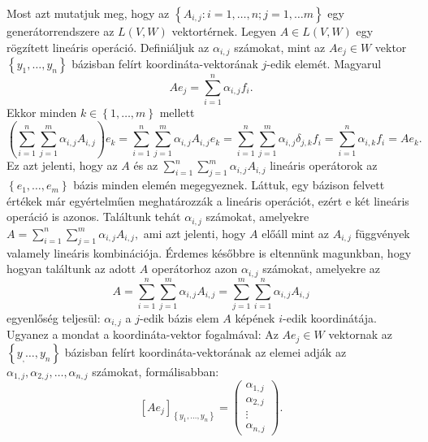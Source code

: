 \documentclass[9pt, showtrims]{memoir}
\makeatletter
\renewenvironment{proof}[1][\proofname]
    {\par\pushQED{\qed}%
    \normalfont \topsep6\p@\@plus6\p@\relax
    \trivlist
    \item[\hskip\labelsep
        \itshape
    #1\@addpunct{:}]\ignorespaces}
    {\popQED\endtrivlist\@endpefalse}
\theoremstyle{plain}
\theoremstyle{remark}
\theoremstyle{definition}
\makeatother
\begin{document}
\begin{proof}
    Most azt mutatjuk meg, hogy az $\left\{ A_{i,j}:i=1,\dots,n;j=1,\dots m \right\}$ egy
    generátorrendszere az $L\left( V,W \right)$ vektortérnek.
    Legyen $A\in L\left( V,W \right)$ egy rögzített lineáris operáció.
    Definiáljuk az $\alpha_{i,j}$ számokat, 
    mint az $Ae_{j}\in W$ vektor $\left\{ y_1,\dots,y_n \right\}$ bázisban felírt koordináta-vektorának 
    $j$-edik elemét. 
    Magyarul
    \[
        Ae_j=
        \sum_{i=1}^n\alpha_{i,j}f_i.
    \]
    Ekkor minden $k\in\left\{ 1,\dots,m \right\}$ mellett
    \[
        \left( \sum_{i=1}^n\sum_{j=1}^m\alpha_{i,j}A_{i,j} \right)e_k
        =
        \sum_{i=1}^n\sum_{j=1}^m\alpha_{i,j}A_{i,j}e_k 
        =
        \sum_{i=1}^n\sum_{j=1}^m\alpha_{i,j}\delta_{j,k}f_i
        =
        \sum_{i=1}^n\alpha_{i,k}f_i
        =Ae_k.
    \]
    Ez azt jelenti, hogy az $A$ és az 
    \begin{math}
        \sum_{i=1}^n\sum_{j=1}^m\alpha_{i,j}A_{i,j}
    \end{math}
    lineáris operátorok az $\left\{ e_1,\dots,e_m \right\}$ bázis minden elemén megegyeznek.
    Láttuk, egy bázison felvett értékek már egyértelműen meghatározzák a lineáris operációt,
    ezért e két lineáris operáció is azonos.
    Találtunk tehát $\alpha_{i,j}$ számokat, amelyekre
    \begin{math}
        A=
        \sum_{i=1}^n\sum_{j=1}^m\alpha_{i,j}A_{i,j},
    \end{math}
    ami azt jelenti, hogy $A$ előáll mint az $A_{i,j}$ függvények valamely lineáris kombinációja.
\end{proof}
Érdemes későbbre is eltennünk magunkban, 
hogy hogyan találtunk az adott $A$ operátorhoz azon $\alpha_{i,j}$ számokat, 
amelyekre az
\[
        A=
        \sum_{i=1}^n\sum_{j=1}^m\alpha_{i,j}A_{i,j}
        =
        \sum_{j=1}^m\sum_{i=1}^n\alpha_{i,j}A_{i,j}
\]
egyenlőség teljesül: 
$\alpha_{i,j}$ a $j$-edik bázis elem $A$ képének $i$-edik koordinátája.
Ugyanez a mondat a koordináta-vektor fogalmával: 
Az $Ae_j\in W$ vektornak az $\left\{ y_,\dots,y_n \right\}$ bázisban felírt koordináta-vektorának az elemei 
adják az $\alpha_{1,j},\alpha_{2,j},\dots,\alpha_{n,j}$ számokat, formálisabban:
\[
    \left[ Ae_j \right]_{\left\{ y_1,\dots,y_n \right\}}
    =
    \begin{pmatrix}
        \alpha_{1,j}\\ \alpha_{2,j}\\ \vdots \\ \alpha_{n,j}
    \end{pmatrix}.
\]
\end{document}
